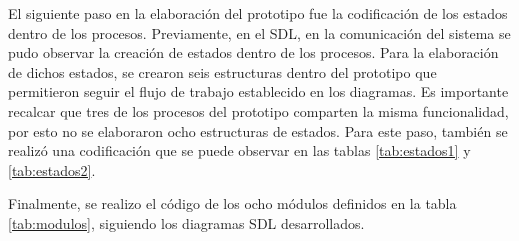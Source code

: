 El siguiente paso en la elaboración del prototipo fue la codificación de los estados dentro de los procesos. Previamente, en el SDL, en la comunicación del sistema se pudo observar la creación de estados dentro de los procesos. Para la elaboración de dichos estados, se crearon seis estructuras dentro del prototipo que permitieron seguir el flujo de trabajo establecido en los diagramas. Es importante recalcar que tres de los procesos del prototipo comparten la misma funcionalidad, por esto no se elaboraron ocho estructuras de estados. Para este paso, también se realizó una codificación que se puede observar en las tablas \ref{tab:estados1} y \ref{tab:estados2}.

\begin{table}[!h]
\caption{Estados del sistema 1/2}
\label{tab:estados1}
\end{table}

\begin{table}[!h]
\caption{Estados del sistema 2/2}
\label{tab:estados2}
\end{table}

Finalmente, se realizo el código de los ocho módulos definidos en la tabla \ref{tab:modulos}, siguiendo los diagramas SDL desarrollados.